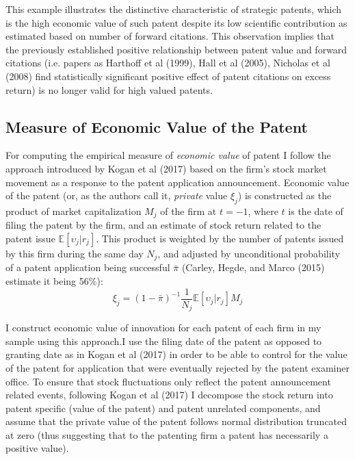 \documentclass[11pt]{article}
\begin{document}
This example illustrates the distinctive characteristic of strategic patents, which is the high economic value of such patent despite its low scientific contribution as estimated based on number of forward citations. This observation implies that the previously established positive relationship between patent value and forward citations (i.e. papers as \color{blue}Harthoff et al (1999), Hall et al (2005), Nicholas et al (2008) \color{black} find statistically significant positive effect of patent citations on excess return) is no longer valid for high valued patents. 


\subsection{Measure of Economic Value of the Patent}

For computing the empirical measure of \textit{economic value} of patent I follow the approach introduced by \color{blue}Kogan et al (2017) \color{black} based on the firm’s stock market movement as a response to the patent application announcement. 
Economic value of the patent (or, as the authors call it, \textit{private} value $\xi_j$) is constructed as the product of market capitalization $M_j$ of the firm at $t = - 1$, where $t$ is the date of filing the patent by the firm, and an estimate of stock return related to the patent issue $\mathbb{E}[{\upsilon_j|r_j}]$. This product is weighted by the number of patents issued by this firm during the same day $N_j$, and adjusted by unconditional probability of a patent application being successful $\bar{\pi}$ \color{blue}(Carley, Hegde, and Marco (2015) \color{black} estimate it being 56\%): 
\begin{equation} \label{eq:kogan}
\xi_j = (1-\bar{\pi})^{-1} \frac{1}{N_j} \mathbb{E}[{\upsilon_j|r_j}] M_j
\end{equation}


I construct economic value of innovation for each patent of each firm in my sample using this approach.I use the filing date of the patent as opposed to granting date as in  \color{blue}Kogan et al (2017)  \color{black} in
order to be able to control for the value of the patent for application that were eventually rejected by
the patent examiner office. To ensure that stock fluctuations only reflect the patent announcement related events, following \color{blue}Kogan et al (2017) \color{black} I decompose the stock return into patent specific (value of the patent) and patent unrelated components, and assume that the private value of the patent follows normal distribution truncated at zero (thus suggesting that to the patenting firm a patent has necessarily a positive value). 
\end{document}
